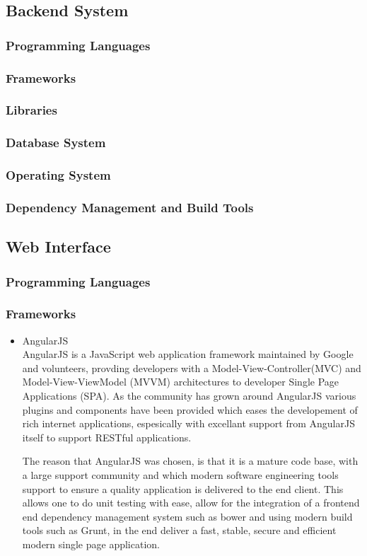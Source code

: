 \documentclass[a4paper,10pt]{article}
\begin{document}
\subsection{Backend System}
\subsubsection{Programming Languages}
\subsubsection{Frameworks}
\subsubsection{Libraries}
\subsubsection{Database System}
\subsubsection{Operating System}
\subsubsection{Dependency Management and Build Tools}

\subsection{Web Interface}
\subsubsection{Programming Languages}
\subsubsection{Frameworks}
	\begin{itemize}
	\item AngularJS\\
		AngularJS is a JavaScript web application framework maintained by Google and volunteers, provding developers with a Model-View-Controller(MVC) and Model-View-ViewModel (MVVM) architectures to developer Single Page Applications (SPA). As the community has grown around AngularJS various plugins and components have been provided which eases the developement of rich internet applications, espesically with excellant support from AngularJS itself to support RESTful applications.

		The reason that AngularJS was chosen, is that it is a mature code base, with a large support community and which modern software engineering tools support to ensure a quality application is delivered to the end client. This allows one to do unit testing with ease, allow for the integration of a frontend end dependency management system such as bower and using modern build tools such as Grunt, in the end deliver a fast, stable, secure and efficient modern single page application.
	\end{itemize}
\end{document}
